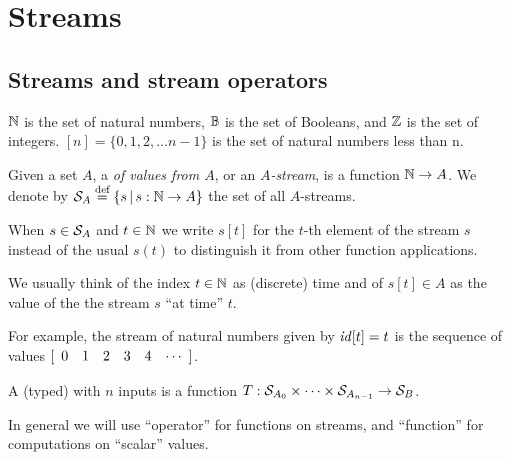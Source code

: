 \section{Streams}\label{sec:streams}

\subsection{Streams and stream operators}\label{sec:notation}

$\mathbb{N}$ is the set of natural numbers, $\mathbb{B}$ is the set of Booleans, and $\mathbb{Z}$ is the set of integers.
$[n] = \{ 0, 1, 2, \ldots n-1 \}$ is the set of natural numbers less than n.

\begin{definition}[stream]
Given a set $A$, a  \emph{of values from $A$}, or an \emph{$A$-stream}, is a function $\mathbb{N} \rightarrow A$. 
We denote by $\mathcal{S}_{A} \stackrel{\textrm{\scriptsize def}}{=} \{ s \,|\, s : \mathbb{N} \to A \}$ the set of all $A$-streams. 
\end{definition}

When $s\in\mathcal{S}_{A}$ and $t\in\mathbb{N}$ we 
write $s[t]$ for the $t$-th element of the stream $s$ instead of the usual $s(t)$
to distinguish it from other function applications.

We usually think of the index $t\in\mathbb{N}$ as (discrete) time and of $s[t]\in A$ 
as the value of the the stream $s$ ``at time'' $t$.

For example, the stream of natural numbers given by $\mathit{id}[t] = t$ is the sequence of values
$\sv{0 1 2 3 4}$.

\begin{comment}
\begin{definition}
A \defined{finite stream} with $n$ values from $A$ is a function $[n] \to A$.
\end{definition}

A prefix of a stream is a finite stream.  For example, the prefix of $\id$ containing 
the first 5 values is the finite stream 
$[\begin{array}{ccccc} 0 & 1 & 2 & 3 & 4 \end{array}]$.
\end{comment}

\begin{definition}
A (typed)  with $n$ inputs is a function $T:\mathcal{S}_{A_0}\times\cdots\times\mathcal{S}_{A_{n-1}}\to\mathcal{S}_{B}$. 
\end{definition}

In general we will use ``operator'' for functions on streams, and
``function'' for computations on ``scalar'' values.

